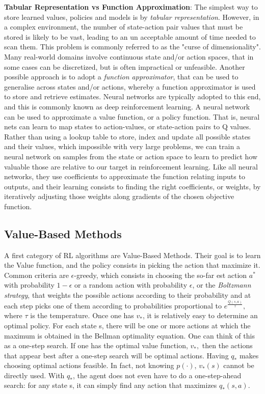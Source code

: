 \textbf{Tabular Representation vs Function Approximation}:
The simplest way to store learned values, policies and models is by \textit{tabular representation}. However, in a complex environment, the number of state-action pair values that must be stored is likely to be vast, leading to an un acceptable amount of time needed to scan them. This problem is commonly referred to as the "curse of dimensionality". Many real-world domains involve continuous state and/or action spaces, that in some cases can be discretized, but is often impractical or unfeasible. Another possible approach is to adopt a \textit{function approximator}, that can be used to generalise across states and/or actions, whereby a function approximator is used to store and retrieve estimates.
Neural networks are typically adopted to this end, and this is commonly known as deep reinforcement learning.
A neural network can be used to approximate a value function, or a policy function. That is, neural nets can learn to map states to action-values, or state-action pairs to Q values. Rather than using a lookup table to store, index and update all possible states and their values, which impossible with very large problems, we can train a neural network on samples from the state or action space to learn to predict how valuable those are relative to our target in reinforcement learning.
Like all neural networks, they use coefficients to approximate the function relating inputs to outputs, and their learning consists to finding the right coefficients, or weights, by iteratively adjusting those weights along gradients of the chosen objective function.



\subsection{Value-Based Methods}
A first category of RL algorithms are Value-Based Methods. Their goal is to learn the Value function, and the policy consists in picking the action that maximize it.
Common criteria are $\epsilon$-greedy, which consists in choosing the so-far est action $a^*$ with probability $1-\epsilon$ or a random action with probability $\epsilon$, or the \textit{Boltzmann strategy}, that weights the possible actions according to their probability and at each step picks one of them according to probabilities proportional to $e^{\frac{Q(s,a)}{\tau}},$ where $\tau$ is the temperature.
Once one has $v_*$, it is relatively easy to determine an optimal policy. For each state s, there will be one or more actions at which the maximum is obtained in the Bellman optimality equation. One can think of this as a one-step search. If one has the optimal value function, $v_*,$ then the actions that appear best after a one-step search will be optimal actions.  
Having $q_*$ makes choosing optimal actions feasible. In fact, not knowing $p(\cdot)$, $v_*(s)$ cannot be directly used. With $q_*$, the agent does not even have to do a one-step-ahead search: for any state s, it can simply find any action that maximizes $q_* (s, a).$


